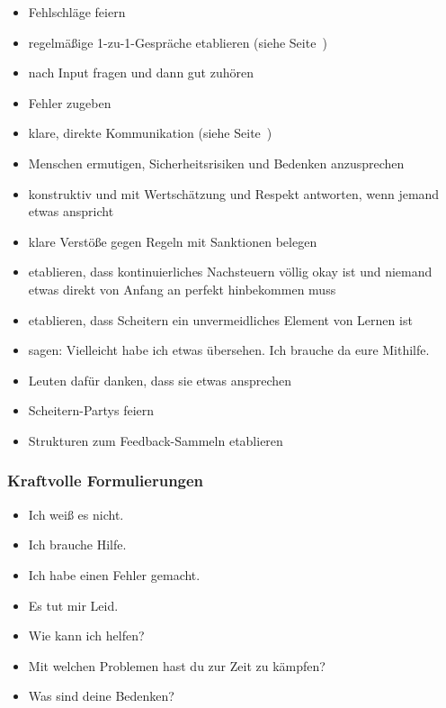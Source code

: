 \begin{itemize}
  \item Fehlschläge feiern 
  \item regelmäßige 1-zu-1-Gespräche etablieren (siehe Seite~\pageref{1-zu-1}) 
  \item nach Input fragen und dann gut zuhören  
  \item Fehler zugeben 
  \item klare, direkte Kommunikation (siehe Seite~\pageref{direkte-kommunikation}) 
  \item Menschen ermutigen, Sicherheitsrisiken und Bedenken anzusprechen
  \item konstruktiv und mit Wertschätzung und Respekt antworten, wenn jemand etwas anspricht  
  \item klare Verstöße gegen Regeln mit Sanktionen belegen  
  \item etablieren, dass kontinuierliches Nachsteuern völlig okay ist und niemand etwas direkt von Anfang an perfekt hinbekommen muss  
  \item etablieren, dass Scheitern ein unvermeidliches Element von Lernen ist 
  \item sagen: \glqq Vielleicht habe ich etwas übersehen. Ich brauche da eure Mithilfe.\grqq {}
  \item Leuten dafür danken, dass sie etwas ansprechen 
  \item Scheitern-Partys feiern 
  \item Strukturen zum Feedback-Sammeln etablieren 
\end{itemize}


\subsubsection{Kraftvolle Formulierungen}

\begin{itemize}
  \item \glqq Ich weiß es nicht.\grqq
  \item \glqq Ich brauche Hilfe.\grqq
  \item \glqq Ich habe einen Fehler gemacht.\grqq {}
  \item \glqq Es tut mir Leid.\grqq
  \item \glqq Wie kann ich helfen?\grqq
  \item \glqq Mit welchen Problemen hast du zur Zeit zu kämpfen?\grqq
  \item \glqq Was sind deine Bedenken?\grqq
\end{itemize}


